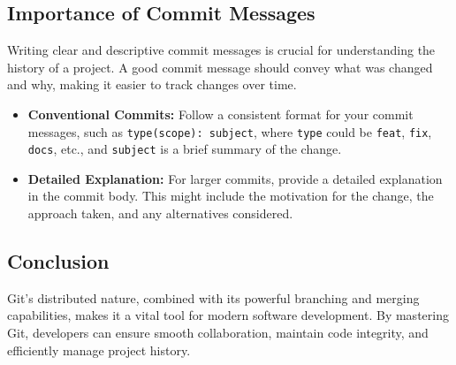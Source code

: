 \subsection{Importance of Commit Messages}
Writing clear and descriptive commit messages is crucial for understanding the history of a project. A good commit message should convey what was changed and why, making it easier to track changes over time.

\begin{itemize}
    \item \textbf{Conventional Commits:} Follow a consistent format for your commit messages, such as \texttt{type(scope): subject}, where \texttt{type} could be \texttt{feat}, \texttt{fix}, \texttt{docs}, etc., and \texttt{subject} is a brief summary of the change.
    \item \textbf{Detailed Explanation:} For larger commits, provide a detailed explanation in the commit body. This might include the motivation for the change, the approach taken, and any alternatives considered.
\end{itemize}

\subsection{Conclusion}
Git's distributed nature, combined with its powerful branching and merging capabilities, makes it a vital tool for modern software development. By mastering Git, developers can ensure smooth collaboration, maintain code integrity, and efficiently manage project history.
